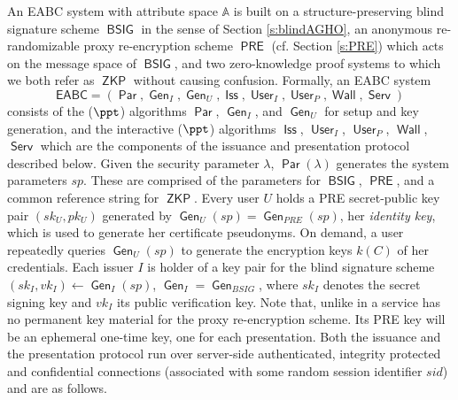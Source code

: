 \documentclass[runningheads]{llncs}
\DeclareMathOperator{\issuer}{\mathsf{Iss}}
\DeclareMathOperator{\user}{\mathsf{User}}
\DeclareMathOperator{\wallet}{\mathsf{Wall}}
\DeclareMathOperator{\service}{\mathsf{Serv}}
\DeclareMathOperator{\BSIG}{\ensuremath{\mathsf{BSIG}}}
\DeclareMathOperator{\PRE}{\ensuremath{\mathsf{PRE}}}
\DeclareMathOperator{\ZKP}{\ensuremath{\mathsf{ZKP}}}
\DeclareMathOperator{\param}{\mathsf{Par}}
\DeclareMathOperator{\gen}{\mathsf{Gen}}
\begin{document}
An EABC system with attribute space $\mathbb A$ is built on a structure-preserving blind signature scheme $\BSIG$ in the sense of Section \ref{s:blindAGHO}, an anonymous re-randomizable proxy re-encryption scheme $\PRE$ (cf. Section \ref{s:PRE}) which acts on the  message space of $\BSIG$, and two zero-knowledge proof systems to which we both refer as $\ZKP$ without causing confusion.
Formally, an EABC system
\[
\mathsf{EABC}=(\param, \gen_{I}, \gen_{U}, \issuer, \user_I, \user_P, \wallet, \service)
\] 
consists of the ($\ppt$) algorithms $\param$, $\gen_{I}$, and $\gen_{U}$ for setup and key generation, and the interactive ($\ppt$) algorithms $ \issuer$, $\user_I$, $\user_P$, $\wallet$, $\service$ which are the components of the issuance and presentation protocol described below. 
Given the security parameter $\lambda$, $\param\left(\lambda\right)$ generates the system parameters $sp$.
These are comprised of the parameters for $\BSIG$, $\PRE$, and a common reference string for $\ZKP$.
Every user $U$ holds a PRE secret-public key pair $(sk_U,pk_U)$ generated by $\gen_{U}(sp)=\gen_{PRE}(sp)$, her \emph{identity key}, which is used to generate her certificate pseudonyms.
On demand, a user repeatedly queries $\gen_U(sp)$ to generate the encryption keys $k(C)$ of her credentials. 
Each issuer $I$ is holder of a key pair for the blind signature scheme $(sk_I,vk_I)\leftarrow\gen_I(sp)$, $\gen_{I}=\gen_{BSIG}$, where $sk_I$ denotes the secret signing key and $vk_I$ its public verification key.
Note that, unlike in \cite{towardsEABC}  a service has no permanent key material for the proxy re-encryption scheme.
Its PRE key will be an ephemeral one-time key, one for each presentation.
Both the issuance and the presentation protocol run over server-side authenticated, integrity protected and confidential connections (associated with some random session identifier $sid$) and are as follows.
\end{document}
